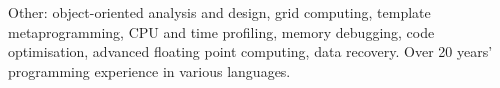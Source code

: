 \begin{longtable}{p{}p{}}
\end{longtable}
\vspace{2\longtabletopsepspecial}
\begin{flushleft}
Other: object-oriented analysis and design, grid computing, \Cplusplus template metaprogramming, CPU and time profiling, memory debugging, code optimisation, advanced floating point computing, data recovery. Over 20 years' programming experience in various languages.
\end{flushleft}










